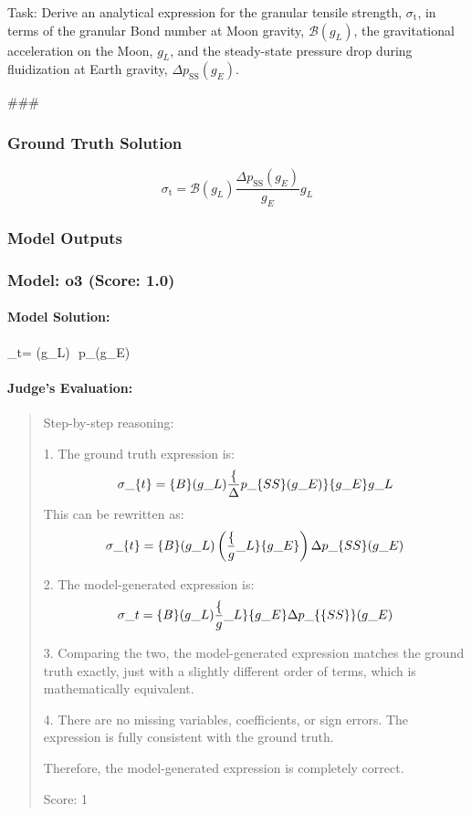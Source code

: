 \documentclass[10pt]{article}
\begin{document}
Task:
Derive an analytical expression for the granular tensile strength, $\sigma_\text{t}$, in terms of the granular Bond number at Moon gravity, $\mathcal{B}(g_L)$, the gravitational acceleration on the Moon, $g_L$, and the steady-state pressure drop during fluidization at Earth gravity, $\Delta p_\text{SS}(g_E)$.

###

\subsubsection*{Ground Truth Solution}
\[ \boxed{\sigma_\text{t} = \mathcal{B}(g_L) \frac{\Delta p_\text{SS}(g_E)}{g_E} g_L} \]

\subsubsection*{Model Outputs}
\subsubsection*{Model: o3 (Score: 1.0)}
\paragraph*{Model Solution:}
\;
      \sigma_{t}= (g_L)\,\,
      \Delta p_{}(g_E)
      \;

\paragraph*{Judge's Evaluation:}
\begin{quote}\ttfamily Step-by-step reasoning:

1. The ground truth expression is:
   \[
   \sigma\_\text\{t\} = \mathcal\{B\}(g\_L) \frac\{\Delta p\_\text\{SS\}(g\_E)\}\{g\_E\} g\_L
   \]
   This can be rewritten as:
   \[
   \sigma\_\text\{t\} = \mathcal\{B\}(g\_L) \left(\frac\{g\_L\}\{g\_E\}\right) \Delta p\_\text\{SS\}(g\_E)
   \]

2. The model-generated expression is:
   \[
   \sigma\_t = \mathcal\{B\}(g\_L) \frac\{g\_L\}\{g\_E\} \Delta p\_\{\text\{SS\}\}(g\_E)
   \]

3. Comparing the two, the model-generated expression matches the ground truth exactly, just with a slightly different order of terms, which is mathematically equivalent.

4. There are no missing variables, coefficients, or sign errors. The expression is fully consistent with the ground truth.

Therefore, the model-generated expression is completely correct.

Score: 1\end{quote}
\end{document}

